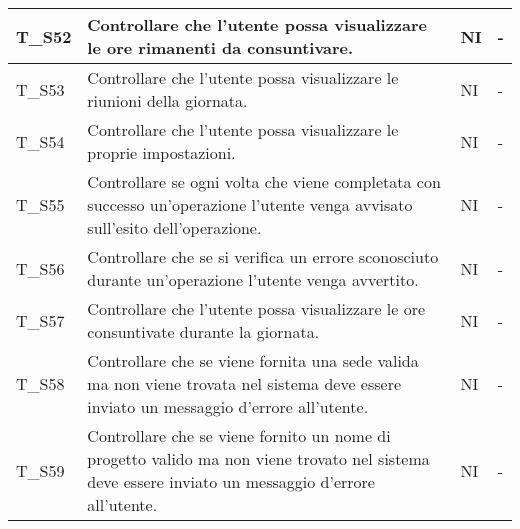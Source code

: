 \begin{center}
\begin{tabular}{ |m{3em}|m{23em}|m{3em}|m{3em}| }
        \hline
        T\_S52 & Controllare che l'utente possa visualizzare le ore rimanenti da consuntivare. & NI & - \\
        \hline
        T\_S53 & Controllare che l'utente possa visualizzare le riunioni della giornata. & NI & - \\
        \hline
        T\_S54 & Controllare che l'utente possa visualizzare le proprie impostazioni. & NI & - \\
        \hline
        T\_S55 & Controllare se ogni volta che viene completata con successo un'operazione l'utente venga avvisato sull'esito dell'operazione. & NI & - \\
        \hline
        T\_S56 & Controllare che se si verifica un errore sconosciuto durante un'operazione l'utente venga avvertito. & NI & - \\
        \hline
        T\_S57 & Controllare che l'utente possa visualizzare le ore consuntivate durante la giornata. & NI & - \\
        \hline
        T\_S58 & Controllare che se viene fornita una sede valida ma non viene trovata nel sistema deve essere inviato un messaggio d'errore all'utente. & NI & - \\
        \hline
        T\_S59 & Controllare che se viene fornito un nome di progetto valido ma non viene trovato nel sistema deve essere inviato un messaggio d'errore all'utente. & NI & - \\
        \hline
    \end{tabular}
\end{center}

